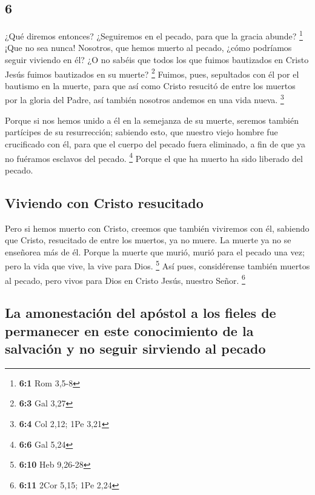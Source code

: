 \begin{paracol}{2}
\hypertarget{section-10}{%
\section{6}\label{section-10}}

 ¿Qué diremos entonces? ¿Seguiremos en el pecado, para que
la gracia abunde? \footnote{\textbf{6:1} Rom 3,5-8}  ¡Que
no sea nunca! Nosotros, que hemos muerto al pecado, ¿cómo podríamos
seguir viviendo en él?  ¿O no sabéis que todos los que
fuimos bautizados en Cristo Jesús fuimos bautizados en su muerte?
\footnote{\textbf{6:3} Gal 3,27}  Fuimos, pues, sepultados
con él por el bautismo en la muerte, para que así como Cristo resucitó
de entre los muertos por la gloria del Padre, así también nosotros
andemos en una vida nueva. \footnote{\textbf{6:4} Col 2,12; 1Pe 3,21}

 Porque si nos hemos unido a él en la semejanza de su
muerte, seremos también partícipes de su resurrección; 
sabiendo esto, que nuestro viejo hombre fue crucificado con él, para que
el cuerpo del pecado fuera eliminado, a fin de que ya no fuéramos
esclavos del pecado. \footnote{\textbf{6:6} Gal 5,24} 
Porque el que ha muerto ha sido liberado del pecado.

\hypertarget{viviendo-con-cristo-resucitado}{%
\subsection{Viviendo con Cristo
resucitado}\label{viviendo-con-cristo-resucitado}}

 Pero si hemos muerto con Cristo, creemos que también
viviremos con él,  sabiendo que Cristo, resucitado de
entre los muertos, ya no muere. La muerte ya no se enseñorea más de él.
 Porque la muerte que murió, murió para el pecado una
vez; pero la vida que vive, la vive para Dios. \footnote{\textbf{6:10}
  Heb 9,26-28}  Así pues, considérense también muertos al
pecado, pero vivos para Dios en Cristo Jesús, nuestro Señor. \footnote{\textbf{6:11}
  2Cor 5,15; 1Pe 2,24}

\hypertarget{la-amonestaciuxf3n-del-apuxf3stol-a-los-fieles-de-permanecer-en-este-conocimiento-de-la-salvaciuxf3n-y-no-seguir-sirviendo-al-pecado}{%
\subsection{La amonestación del apóstol a los fieles de permanecer en
este conocimiento de la salvación y no seguir sirviendo al
pecado}\label{la-amonestaciuxf3n-del-apuxf3stol-a-los-fieles-de-permanecer-en-este-conocimiento-de-la-salvaciuxf3n-y-no-seguir-sirviendo-al-pecado}}


\end{paracol}
